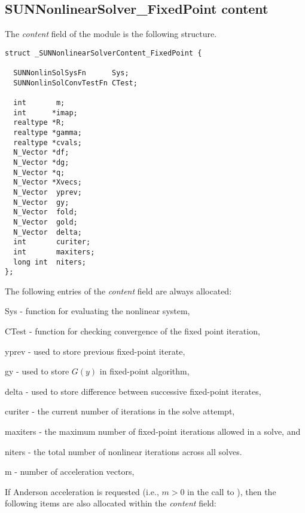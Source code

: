\subsection{SUNNonlinearSolver\_FixedPoint content}
\label{ss:sunnonlinsolfixedpoint_content}

The \textit{content} field of the {\sunnonlinsolfixedpoint} module is the
following structure.
\begin{verbatim}
struct _SUNNonlinearSolverContent_FixedPoint {

  SUNNonlinSolSysFn      Sys;
  SUNNonlinSolConvTestFn CTest;

  int       m;
  int      *imap;
  realtype *R;
  realtype *gamma;
  realtype *cvals;
  N_Vector *df;
  N_Vector *dg;
  N_Vector *q;
  N_Vector *Xvecs;
  N_Vector  yprev;
  N_Vector  gy;
  N_Vector  fold;
  N_Vector  gold;
  N_Vector  delta;
  int       curiter;
  int       maxiters;
  long int  niters;
};
\end{verbatim}
The following entries of the \emph{content} field are always
allocated:
\begin{args}[maxiters]
  \item[Sys]      - function for evaluating the nonlinear system,
  \item[CTest]    - function for checking convergence of the fixed point iteration,
  \item[yprev]    -  used to store previous fixed-point iterate,
  \item[gy]       -  used to store $G(y)$ in fixed-point algorithm,
  \item[delta]    -  used to store difference between successive fixed-point iterates,
  \item[curiter]  - the current number of iterations in the solve attempt,
  \item[maxiters] - the maximum number of fixed-point iterations allowed in
                    a solve, and
  \item[niters]   - the total number of nonlinear iterations across all
                    solves.
  \item[m]        - number of acceleration vectors,
\end{args}
If Anderson acceleration is requested (i.e., $m>0$ in the call to
), then the following items are also
allocated within the \emph{content} field:
